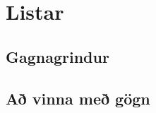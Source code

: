 
\chapter{Listar}\label{k:listar}


\section{Gagnagrindur}\label{uk:gagnagrindur-listar}

\section{Að vinna með gögn}\label{uk:gagnavinnsla-listar}
